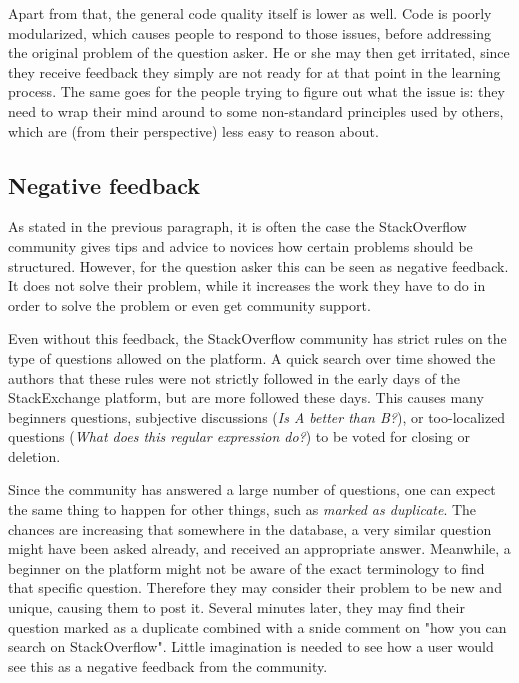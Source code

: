 \documentclass[conference]{IEEEtran}
\begin{document}
Apart from that, the general code quality itself is lower as well. Code is
poorly modularized, which causes people to respond to those issues, before
addressing the original problem of the question asker. He or she may then get
irritated, since they receive feedback they simply are not ready for at that
point in the learning process. The same goes for the people trying to figure
out what the issue is: they need to wrap their mind around to some non-standard
principles used by others, which are (from their perspective) less easy to
reason about.

\subsection{Negative feedback}

As stated in the previous paragraph, it is often the case the StackOverflow
community gives tips and advice to novices how certain problems should be
structured. However, for the question asker this can be seen as negative
feedback. It does not solve their problem, while it increases the work they
have to do in order to solve the problem or even get community support.

Even without this feedback, the StackOverflow community has strict rules on the
type of questions allowed on the platform. A quick search over time showed the
authors that these rules were not strictly followed in the early days of the
StackExchange platform, but are more followed these days. This causes many
beginners questions, subjective discussions (\textit{Is A better than B?}), or
too-localized questions (\textit{What does this regular expression do?}) to be
voted for closing or deletion.

Since the community has answered a large number of questions, one can expect
the same thing to happen for other things, such as \textit{marked as
duplicate}. The chances are increasing that somewhere in the database, a very
similar question might have been asked already, and received an appropriate
answer. Meanwhile, a beginner on the platform might not be aware of the exact
terminology to find that specific question. Therefore they may consider their
problem to be new and unique, causing them to post it. Several minutes later,
they may find their question marked as a duplicate combined with a snide
comment on "how you can search on StackOverflow". Little imagination is needed
to see how a user would see this as a negative feedback from the community.
\end{document}
